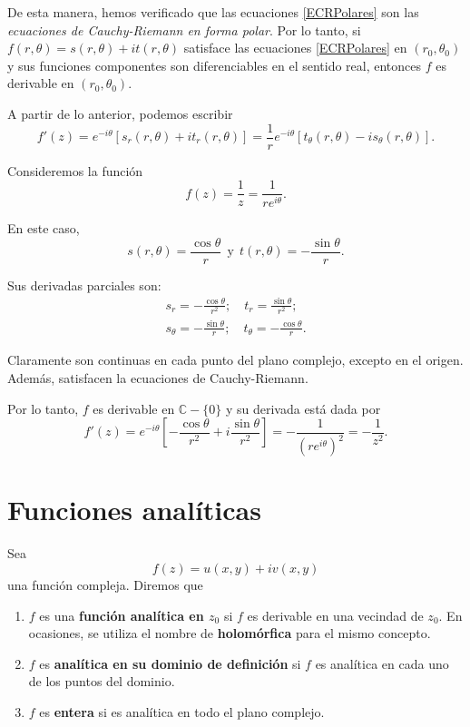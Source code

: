 De esta manera, hemos verificado  que las ecuaciones \eqref{ECRPolares} son las \textit{ ecuaciones de Cauchy-Riemann en forma polar}. Por lo tanto, si $f(r,\theta) = s(r,\theta) + i t(r,\theta)$ satisface las ecuaciones \eqref{ECRPolares} en $(r_0,\theta_0)$ y sus funciones componentes son diferenciables en el sentido real, entonces $f$ es derivable en $(r_0,\theta_0)$.

A partir de lo anterior, podemos escribir
$$f'(z) = e^{-i\theta} [s_r(r,\theta) + it_r (r,\theta)] = \frac{1}{r}e^{-i\theta} [t_{\theta}(r,\theta) - i s_{\theta} (r,\theta)].$$

\begin{ejemplo}
Consideremos la función 
$$f(z) = \frac{1}{z} = \frac{1}{re^{i\theta}}.$$

En este caso,
$$s(r,\theta) = \frac{\cos \theta}{r} ~~\mbox{y}~~ t(r,\theta) = -\frac{\sin \theta}{r}.$$

Sus derivadas parciales son:
\begin{eqnarray*}
s_r = - \frac{\cos \theta }{r^2}; \quad t_r = \frac{\sin\theta}{r^2}; \\
s_{\theta} = - \frac{\sin \theta}{r}; \quad t_{\theta} =  -\frac{\cos\theta}{r}  .
\end{eqnarray*}

Claramente son continuas en cada punto del plano complejo, excepto en el origen. Además, satisfacen la ecuaciones de Cauchy-Riemann. 

Por lo tanto, $f$ es derivable en $\mathbb{C}-\{0\}$ y su derivada está dada por 
$$f'(z) = e^{-i\theta} \left[ - \frac{\cos \theta}{r^2} + i \frac{\sin\theta}{r^2} \right] = - \frac{1}{(re^{i\theta})^2} = -\frac{1}{z^2}.$$

\end{ejemplo}

\section{Funciones analíticas}
 
\begin{defi}
Sea $$f(z) = u(x,y) + iv(x,y)$$ una función compleja. Diremos que

\begin{enumerate}
\item $f$ es una \textbf{función analítica en $z_0$} si $f$ es derivable en una vecindad de $z_0$. En ocasiones, se utiliza el nombre de \textbf{holomórfica} para el mismo concepto.

\item $f$ es \textbf{analítica en su dominio de definición} si $f$ es analítica en cada uno de los puntos del dominio.

\item $f$ es \textbf{entera} si es analítica en todo el plano complejo.
\end{enumerate}
\end{defi}

